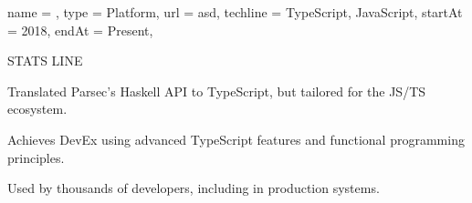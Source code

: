 \begin{projectx}{%
    name = {\parjs},
    type = {Platform},
    url = asd,
    techline = {TypeScript, JavaScript},
    startAt = 2018,
    endAt = Present,
  }
\item STATS LINE
\item Translated Parsec's Haskell API to TypeScript, but tailored
  for the JS/TS ecosystem.
\item Achieves DevEx using advanced TypeScript features and
  functional programming principles.
\item Used by thousands of developers, including in production systems.
\end{projectx}
